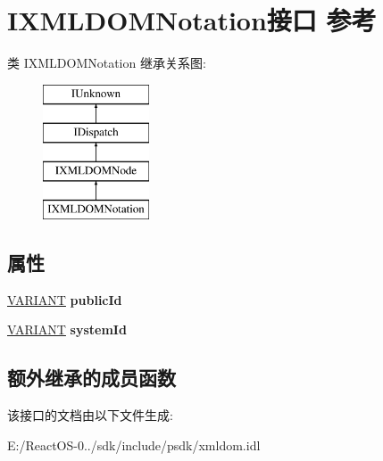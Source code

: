 \hypertarget{interface_i_x_m_l_d_o_m_notation}{}\section{I\+X\+M\+L\+D\+O\+M\+Notation接口 参考}
\label{interface_i_x_m_l_d_o_m_notation}
类 I\+X\+M\+L\+D\+O\+M\+Notation 继承关系图\+:\begin{figure}[H]
\begin{center}
\leavevmode
\includegraphics[height=4.000000cm]{interface_i_x_m_l_d_o_m_notation}
\end{center}
\end{figure}
\subsection*{属性}
\begin{DoxyCompactItemize}
\item 
\mbox{\label{interface_i_x_m_l_d_o_m_notation_aeef06b0db03a608b93ce281cd27159a8}} 
\hyperlink{structtag_v_a_r_i_a_n_t}{V\+A\+R\+I\+A\+NT} {\bfseries public\+Id}
\item 
\mbox{\label{interface_i_x_m_l_d_o_m_notation_a8304bbc1a01732b444d79316ecc363c2}} 
\hyperlink{structtag_v_a_r_i_a_n_t}{V\+A\+R\+I\+A\+NT} {\bfseries system\+Id}
\end{DoxyCompactItemize}
\subsection*{额外继承的成员函数}


该接口的文档由以下文件生成\+:\begin{DoxyCompactItemize}
\item 
E\+:/\+React\+O\+S-\/0../sdk/include/psdk/xmldom.\+idl\end{DoxyCompactItemize}
